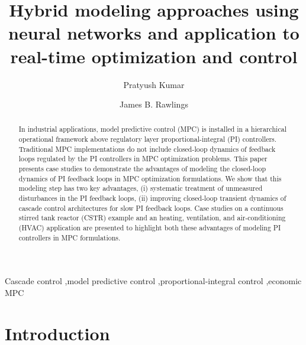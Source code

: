 \documentclass[preprint,5p, twocolumn, authoryear]{elsarticle}
\begin{document}
\begin{frontmatter}


\title{Hybrid modeling approaches using neural networks and
application to real-time optimization and control}

\author[label1]{Pratyush Kumar}

\author[label1]{James B. Rawlings}

\address[label1]{Department of Chemical Engineering, University of California,
        Santa Barbara, CA 93106, United States} 
                
\begin{abstract}

In industrial applications, model predictive control (MPC) is installed in a
hierarchical operational framework above regulatory layer proportional-integral
(PI) controllers. Traditional MPC implementations do not include closed-loop
dynamics of feedback loops regulated by the PI controllers in MPC optimization
problems. This paper presents case studies to demonstrate the advantages of
modeling the closed-loop dynamics of PI feedback loops in MPC optimization
formulations. We show that this modeling step has two key advantages, (i)
systematic treatment of unmeasured disturbances in the PI feedback loops, (ii)
improving closed-loop transient dynamics of cascade control architectures for
slow PI feedback loops. Case studies on a continuous stirred tank reactor (CSTR)
example and an heating, ventilation, and air-conditioning (HVAC) application are
presented to highlight both these advantages of modeling PI controllers in MPC
formulations. 

\end{abstract}

\begin{keyword}
Cascade control \sep model predictive control \sep proportional-integral control
\sep economic MPC
\end{keyword}

\end{frontmatter}

\section{Introduction} \label{sec:introduction}
\end{document}
